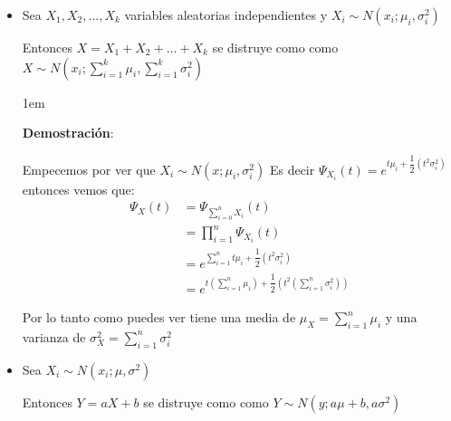 \documentclass[12pt, fleqn]{report}                             %
\newenvironment{SmallIndentation}[1][0.75em]                    %
        {\begin{adjustwidth}{#1}{}\begin{footnotesize}}             %
        {\end{footnotesize}\end{adjustwidth}}                       %
\theoremstyle{break}                                            %
\newcommand{\Wrap}[1]           {\left( #1 \right)}             %
\begin{document}
                \begin{itemize}

                    \item 
                        Sea $X_1, X_2, \dots, X_k$ variables aleatorias independientes
                        y $X_i \sim N(x_i; \mu_i, \sigma_i^2)$  

                        Entonces $X = X_1 + X_2 + \dots + X_k$ se distruye como
                        como $X \sim N(x_i; \sum_{i=1}^k \mu_i, \sum_{i=1}^k \sigma_i^2)$

                        \begin{SmallIndentation}[1em]
                            \textbf{Demostración}:
                            
                            Empecemos por ver que $X_i \sim N(x; \mu_i, \sigma^2_i)$
                            Es decir $\Psi_{X_i}(t) = e^{t\mu_i + \dfrac{1}{2}(t^2\sigma^2_i)}$
                            entonces vemos que:
                            \begin{align*}
                                \Psi_X(t)
                                    &= \Psi_{\sum_{i=0}^n X_i} (t)                                                          \\
                                    &= \prod_{i=1}^n \Psi_{X_i} (t)                                                         \\
                                    &= e^{\sum_{i=1}^n t\mu_i + \dfrac{1}{2}(t^2\sigma^2_i)}                                \\    
                                    &= e^{t\Wrap{ \sum_{i=1}^n \mu_i} + \dfrac{1}{2}(t^2\Wrap{\sum_{i=1}^n \sigma^2_i})} 
                            \end{align*}

                            Por lo tanto como puedes ver tiene una media de $\mu_X = \sum_{i=1}^n \mu_i$
                            y una varianza de $\sigma^2_X = \sum_{i=1}^n \sigma^2_i$

                        \end{SmallIndentation}
                            


                    \item 
                        Sea $X_i \sim N(x_i; \mu, \sigma^2)$  

                        Entonces $Y = aX + b$ se distruye como
                        como $Y \sim N(y; a\mu + b, a\sigma^2)$


\end{itemize}
\end{document}

